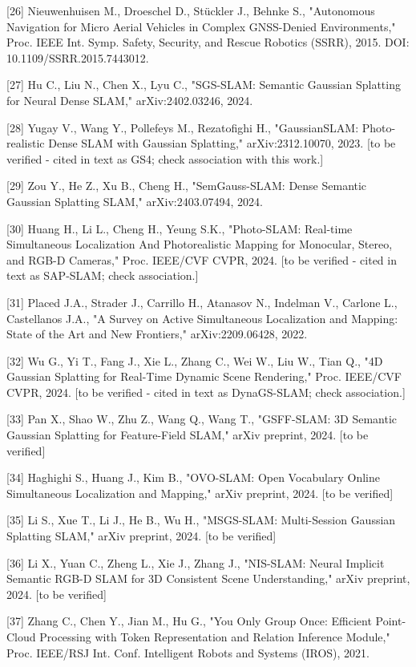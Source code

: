\documentclass[
]{article}
\begin{document}
{[}26{]} Nieuwenhuisen M., Droeschel D., Stückler J., Behnke S.,
"Autonomous Navigation for Micro Aerial Vehicles in Complex GNSS-Denied
Environments," Proc. IEEE Int. Symp. Safety, Security, and Rescue
Robotics (SSRR), 2015. DOI: 10.1109/SSRR.2015.7443012.

{[}27{]} Hu C., Liu N., Chen X., Lyu C., "SGS-SLAM: Semantic Gaussian
Splatting for Neural Dense SLAM," arXiv:2402.03246, 2024.

{[}28{]} Yugay V., Wang Y., Pollefeys M., Rezatofighi H., "GaussianSLAM:
Photo-realistic Dense SLAM with Gaussian Splatting," arXiv:2312.10070,
2023. {[}to be verified - cited in text as GS4; check association with
this work.{]}

{[}29{]} Zou Y., He Z., Xu B., Cheng H., "SemGauss-SLAM: Dense Semantic
Gaussian Splatting SLAM," arXiv:2403.07494, 2024.

{[}30{]} Huang H., Li L., Cheng H., Yeung S.K., "Photo-SLAM: Real-time
Simultaneous Localization And Photorealistic Mapping for Monocular,
Stereo, and RGB-D Cameras," Proc. IEEE/CVF CVPR, 2024. {[}to be verified
- cited in text as SAP-SLAM; check association.{]}

{[}31{]} Placed J.A., Strader J., Carrillo H., Atanasov N., Indelman V.,
Carlone L., Castellanos J.A., "A Survey on Active Simultaneous
Localization and Mapping: State of the Art and New Frontiers,"
arXiv:2209.06428, 2022.

{[}32{]} Wu G., Yi T., Fang J., Xie L., Zhang C., Wei W., Liu W., Tian
Q., "4D Gaussian Splatting for Real-Time Dynamic Scene Rendering," Proc.
IEEE/CVF CVPR, 2024. {[}to be verified - cited in text as DynaGS-SLAM;
check association.{]}

{[}33{]} Pan X., Shao W., Zhu Z., Wang Q., Wang T., "GSFF-SLAM: 3D
Semantic Gaussian Splatting for Feature-Field SLAM," arXiv preprint,
2024. {[}to be verified{]}

{[}34{]} Haghighi S., Huang J., Kim B., "OVO-SLAM: Open Vocabulary
Online Simultaneous Localization and Mapping," arXiv preprint, 2024.
{[}to be verified{]}

{[}35{]} Li S., Xue T., Li J., He B., Wu H., "MSGS-SLAM: Multi-Session
Gaussian Splatting SLAM," arXiv preprint, 2024. {[}to be verified{]}

{[}36{]} Li X., Yuan C., Zheng L., Xie J., Zhang J., "NIS-SLAM: Neural
Implicit Semantic RGB-D SLAM for 3D Consistent Scene Understanding,"
arXiv preprint, 2024. {[}to be verified{]}

{[}37{]} Zhang C., Chen Y., Jian M., Hu G., "You Only Group Once:
Efficient Point-Cloud Processing with Token Representation and Relation
Inference Module," Proc. IEEE/RSJ Int. Conf. Intelligent Robots and
Systems (IROS), 2021.
\end{document}
